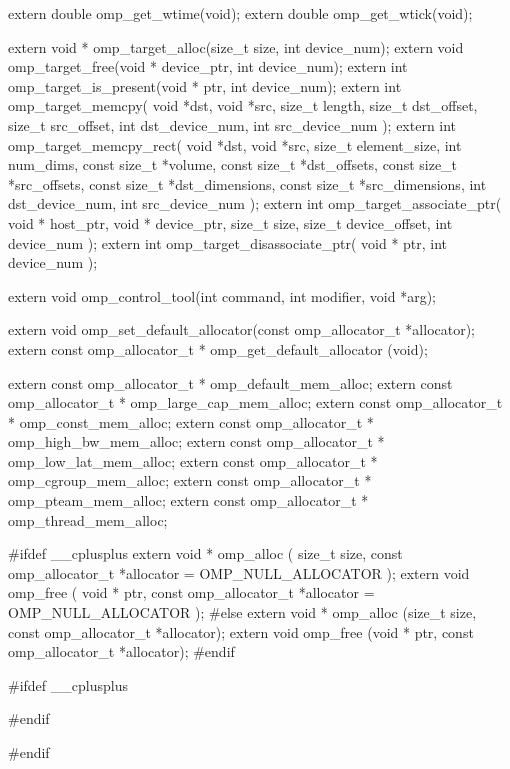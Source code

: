 {\begin{ompcFunction}
{extern double omp_get_wtime(void);
extern double omp_get_wtick(void);

extern void * omp_target_alloc(size_t size, int device_num);
extern void omp_target_free(void * device_ptr, int device_num);
extern int omp_target_is_present(void * ptr, int device_num);
extern int omp_target_memcpy(
  void *dst,
  void *src,
  size_t length,
  size_t dst_offset,
  size_t src_offset,
  int dst_device_num,
  int src_device_num
);
extern int omp_target_memcpy_rect(
  void *dst,
  void *src,
  size_t element_size,
  int num_dims,
  const size_t *volume,
  const size_t *dst_offsets,
  const size_t *src_offsets,
  const size_t *dst_dimensions,
  const size_t *src_dimensions,
  int dst_device_num,
  int src_device_num
);
extern int omp_target_associate_ptr(
  void * host_ptr,
  void * device_ptr,
  size_t size,
  size_t device_offset,
  int device_num
);
extern int omp_target_disassociate_ptr(
  void * ptr,
  int device_num
);

extern void omp_control_tool(int command, int modifier, void *arg);

extern void omp_set_default_allocator(const omp_allocator_t *allocator);
extern const omp_allocator_t * omp_get_default_allocator (void);


extern const omp_allocator_t * omp_default_mem_alloc;
extern const omp_allocator_t * omp_large_cap_mem_alloc;
extern const omp_allocator_t * omp_const_mem_alloc;
extern const omp_allocator_t * omp_high_bw_mem_alloc;
extern const omp_allocator_t * omp_low_lat_mem_alloc;
extern const omp_allocator_t * omp_cgroup_mem_alloc;
extern const omp_allocator_t * omp_pteam_mem_alloc;
extern const omp_allocator_t * omp_thread_mem_alloc;


#ifdef __cplusplus
extern void * omp_alloc (
  size_t size,
  const omp_allocator_t *allocator = OMP_NULL_ALLOCATOR
);
extern void omp_free (
  void * ptr,
  const omp_allocator_t *allocator = OMP_NULL_ALLOCATOR
);
#else
extern void * omp_alloc (size_t size, const omp_allocator_t *allocator);
extern void omp_free (void * ptr, const omp_allocator_t *allocator);
#endif


#ifdef __cplusplus
}
#endif

#endif
\end{ompcFunction}} %

\pagebreak

